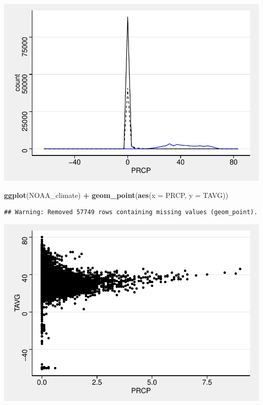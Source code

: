 \documentclass[]{article}
\newenvironment{Shaded}{\begin{snugshade}}{\end{snugshade}}
\newcommand{\DataTypeTok}[1]{\textcolor[rgb]{0.13,0.29,0.53}{#1}}
\newcommand{\KeywordTok}[1]{\textcolor[rgb]{0.13,0.29,0.53}{\textbf{#1}}}
\newcommand{\NormalTok}[1]{#1}
\newcommand{\OperatorTok}[1]{\textcolor[rgb]{0.81,0.36,0.00}{\textbf{#1}}}
\newcommand{\StringTok}[1]{\textcolor[rgb]{0.31,0.60,0.02}{#1}}
\begin{document}
\includegraphics{data_exploration_files/figure-latex/unnamed-chunk-5-3.pdf}

\begin{Shaded}
\begin{Highlighting}[]
\KeywordTok{ggplot}\NormalTok{(NOAA_climate) }\OperatorTok{+}
\StringTok{  }\KeywordTok{geom_point}\NormalTok{(}\KeywordTok{aes}\NormalTok{(}\DataTypeTok{x =}\NormalTok{ PRCP, }\DataTypeTok{y =}\NormalTok{ TAVG))}
\end{Highlighting}
\end{Shaded}

\begin{verbatim}
## Warning: Removed 57749 rows containing missing values (geom_point).
\end{verbatim}

\includegraphics{data_exploration_files/figure-latex/unnamed-chunk-5-4.pdf}
\end{document}
